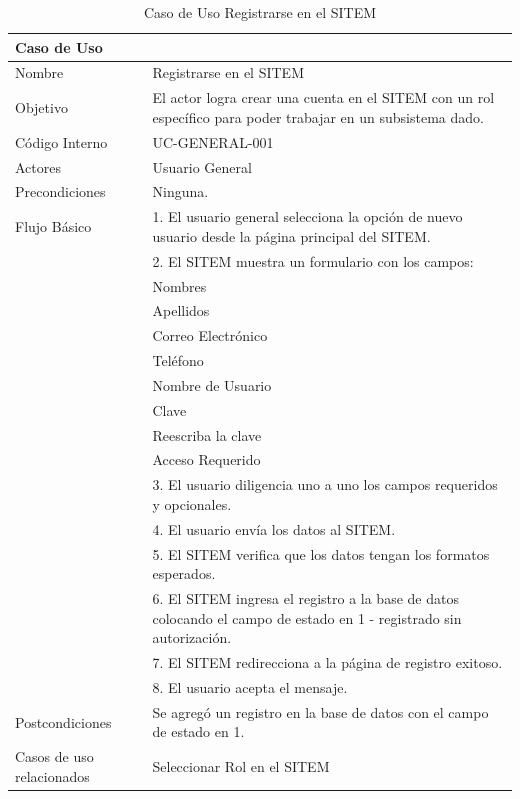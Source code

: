 \begin{table}
\begin{center}
\begin{tabular}{|l|p{10cm}|}
\hline
\textbf{Caso de Uso}&\\
\hline
Nombre & Registrarse en el SITEM\\
\hline
Objetivo & El actor logra crear una cuenta en el SITEM con un rol específico para poder trabajar en un subsistema dado.\\
\hline
Código Interno & UC-GENERAL-001 \\
\hline
Actores & Usuario General\\
\hline
Precondiciones & Ninguna.\\
\hline
Flujo Básico & 1. El usuario general selecciona la opción de nuevo usuario desde la página principal del SITEM.\\
& 2. El SITEM muestra un formulario con los campos:\\
& Nombres\\
& Apellidos\\
& Correo Electrónico\\
& Teléfono\\
& Nombre de Usuario\\
& Clave\\
& Reescriba la clave\\
& Acceso Requerido\\
& 3. El usuario diligencia uno a uno los campos requeridos y opcionales.\\
& 4. El usuario envía los datos al SITEM.\\
& 5. El SITEM verifica que los datos tengan los formatos esperados.\\
& 6. El SITEM ingresa el registro a la base de datos colocando el campo de estado en 1 - registrado sin autorización.\\
& 7. El SITEM redirecciona a la página de registro exitoso.\\
& 8. El usuario acepta el mensaje.\\
\hline
Postcondiciones & Se agregó un registro en la base de datos con el campo de estado en 1.\\
\hline
Casos de uso relacionados&Seleccionar Rol en el SITEM\\
\hline
\end{tabular}
\caption{Caso de Uso Registrarse en el SITEM}
\label{casouso} 
\end{center}
\end{table}

